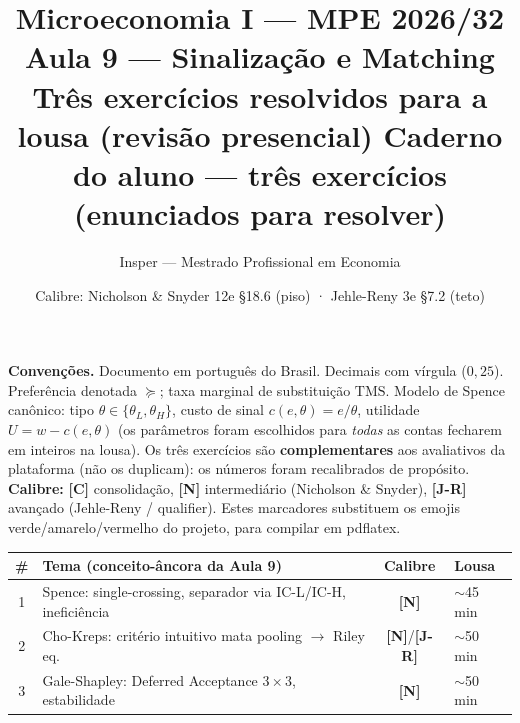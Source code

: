 \documentclass[11pt,a4paper]{article}
\title{\textbf{\textcolor{insper}{Microeconomia I — MPE 2026/32}}\\[4pt]
\large Aula 9 — Sinalização e Matching\\[2pt]
\normalsize \ifsolucao Três exercícios resolvidos para a lousa (revisão presencial)%
\else Caderno do aluno — três exercícios (enunciados para resolver)\fi}
\author{Insper — Mestrado Profissional em Economia}
\date{Calibre: Nicholson \& Snyder 12e §18.6 (piso) · Jehle-Reny 3e §7.2 (teto)}
\newcommand{\calY}{\textbf{\textcolor{amarelo}{[N]}}} %
\newcommand{\calR}{\textbf{\textcolor{verm}{[J-R]}}}  %
\newcommand{\calG}{\textbf{\textcolor{verde}{[C]}}}   %
\newcommand{\TMS}{\text{TMS}}
\newcommand{\dc}[2]{#1{,}#2}
\newif\ifsolucao
\begin{document}
\maketitle

\noindent\textbf{Convenções.} Documento em português do Brasil. Decimais com vírgula
($\dc{0}{25}$). Preferência denotada $\succeq$; taxa marginal de substituição $\TMS$.
Modelo de Spence canônico: tipo $\theta\in\{\theta_L,\theta_H\}$, custo de sinal
$c(e,\theta)=e/\theta$, utilidade $U=w-c(e,\theta)$ (os parâmetros foram escolhidos para
\emph{todas} as contas fecharem em inteiros na lousa). Os três exercícios são
\textbf{complementares} aos avaliativos da plataforma (não os duplicam): os números foram
recalibrados de propósito. \textbf{Calibre:} \calG{} consolidação, \calY{} intermediário
(Nicholson \& Snyder), \calR{} avançado (Jehle-Reny / qualifier). Estes marcadores
substituem os emojis verde/amarelo/vermelho do projeto, para compilar em pdflatex.

\ifsolucao
\smallskip
\noindent\textbf{\textcolor{mundo}{Tensão de calibre — leitura honesta.}} O professor pediu
``nível Nicholson''. Spence (Exercício~1) está em N\&S 12e §18.6, então fica exatamente no
piso. Mas \emph{Cho-Kreps} (Exercício~2) e \emph{matching} (Exercício~3) \textbf{não estão no
Nicholson} — vivem em Jehle-Reny e MWG. Como conciliei? Mantive a \textbf{mecânica} desses dois
no nível N\&S: só computação concreta (números que fecham, execução passo a passo do algoritmo,
checagem de desigualdades de incentivo), \emph{sem nenhuma} prova de existência ou teorema
formal. O \emph{tópico} está acima do N\&S; o que se \emph{exige} do aluno, não. Está dito.

\smallskip
\noindent\textbf{\textcolor{mundo}{Como ler este material.}} A turma do MPE é heterogênea:
há advogados, engenheiros e gente de negócios que nunca viu microeconomia avançada. Por isso a
versão-solução traz, ao lado da álgebra, \textbf{caixas azuis ``Em palavras''}. Elas são
\emph{andaime de leitura para estudo em casa}: explicam cada passo em português comum, definem
o jargão na primeira aparição e traduzem cada resultado para a intuição. Na lousa, o professor
escreve apenas a álgebra (a caixa azul \emph{não} consome tempo de quadro); você usa a prosa
azul depois, sozinho, para destravar o que ficou opaco. As \textbf{caixas vermelhas}
(``Comentário pedagógico'') são a leitura do professor em 5 passos — registro técnico.
\fi

\medskip
\begin{center}
\begin{tabular}{@{}clcl@{}}
\toprule
\# & Tema (conceito-âncora da Aula 9) & Calibre & Lousa \\
\midrule
1 & Spence: single-crossing, separador via IC-L/IC-H, ineficiência & \calY & $\sim$45 min \\
2 & Cho-Kreps: critério intuitivo mata pooling $\to$ Riley eq. & \calY/\calR & $\sim$50 min \\
3 & Gale-Shapley: Deferred Acceptance $3\times3$, estabilidade & \calY & $\sim$50 min \\
\bottomrule
\end{tabular}
\end{center}
\end{document}
